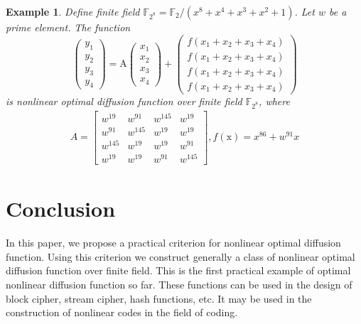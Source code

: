 \documentclass[12pt,a4paper]{article}
\newcommand{\0}{\textbf{0}}
\newcommand{\1}{\textbf{1}}
\newtheorem{example}{Example}
\begin{document}
        \begin{example}
        Define finite field $\mathbb{F}_{2^{8}}=\mathbb{F}_{2} /\left(x^{8}+x^{4}+x^{3}+x^{2}+1\right)$. Let $w$ be a prime element. The function
            $$
        \left(\begin{array}{l}
        y_{1} \\y_{2} \\y_{3} \\y_{4}
        \end{array}\right)=\mathrm{A}\left(\begin{array}{l}
        x_{1} \\x_{2} \\x_{3} \\x_{4}
        \end{array}\right)+\left(\begin{array}{l}
        f\left(x_{1}+x_{2}+x_{3}+x_{4}\right) \\
        f\left(x_{1}+x_{2}+x_{3}+x_{4}\right) \\
        f\left(x_{1}+x_{2}+x_{3}+x_{4}\right) \\
        f\left(x_{1}+x_{2}+x_{3}+x_{4}\right)
        \end{array}\right)
        $$
        is nonlinear optimal diffusion function over finite field $\mathbb{F}_{2^{8}}$, where
        $$
        \begin{gathered}
        A=\left[\begin{array}{cccc}
        w^{19} & w^{91} & w^{145} & w^{19} \\
        w^{91} & w^{145} & w^{19} & w^{19} \\
        w^{145} & w^{19} & w^{19} & w^{91} \\
        w^{19} & w^{19} & w^{91} & w^{145}
        \end{array}\right], 
        f(\mathrm{x})=x^{86}+w^{91} x
        \end{gathered}
        $$
    \end{example}
    \section{Conclusion}

    In this paper, we propose a practical criterion for nonlinear optimal diffusion function. 
    Using this criterion we construct generally a class of nonlinear optimal diffusion function over finite field. 
    This is the first practical example of optimal nonlinear diffusion function so far. 
    These functions can be used in the design of block cipher, stream cipher, hash functions, etc. 
    It may be used in the construction of nonlinear codes in the field of coding.

    
    
\end{document}
